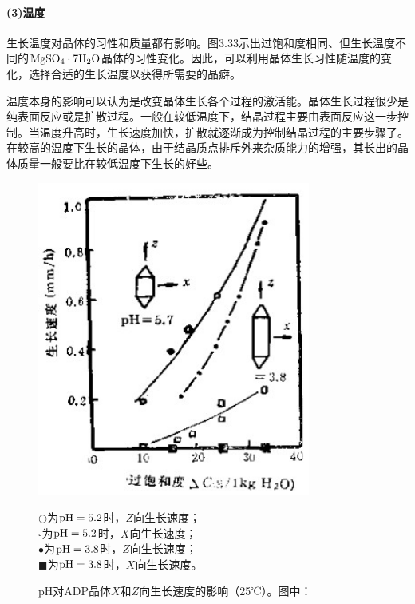 \paragraph{(3)温度}生长温度对晶体的习性和质量都有影响。图3.33示出过饱和度相同、但生长温度不同的$\rm MgSO_4\cdot 7H_2O$晶体的习性变化。因此，可以利用晶体生长习性随温度的变化，选择合适的生长温度以获得所需要的晶癖。

温度本身的影响可以认为是改变晶体生长各个过程的激活能。晶体生长过程很少是纯表面反应或是扩散过程。一般在较低温度下，结晶过程主要由表面反应这一步控制。当温度升高时，生长速度加快，扩散就逐渐成为控制结晶过程的主要步骤了。在较高的温度下生长的晶体，由于结晶质点排斥外来杂质能力的增强，其长出的晶体质量一般要比在较低温度下生长的好些。


\begin{figure}[htbp]
 \centering
 \includegraphics[width=0.8\textwidth]{fig/cp03/img3.32.jpg}
 \caption{pH对ADP晶体$X$和$Z$向生长速度的影响（25℃）。图中：}
$\bigcirc$为$\rm pH=5.2$时，$Z$向生长速度；\\
$\square$为$\rm pH=5.2$时，$X$向生长速度；\\
$\bullet$为$\rm pH=3.8$时，$Z$向生长速度；\\
$\blacksquare$为$\rm pH=3.8$时，$X$向生长速度。\\
\end{figure}

